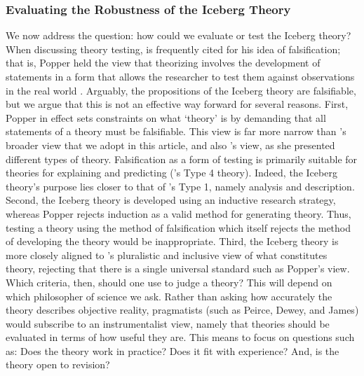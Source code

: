 \documentclass[smallextended]{svjour3}
\begin{document}
\subsubsection{Evaluating the Robustness of the Iceberg Theory}
We now address the question: how could we evaluate or test the Iceberg theory? When discussing theory testing, \citet{popper1980} is frequently cited for his idea of falsification; that is, Popper held the view that theorizing involves the development of statements in a form that allows the researcher to test them against observations in the real world \citep[p. 614]{gregor2006nature}. Arguably, the propositions of the Iceberg theory are falsifiable, but we argue that this is not an effective way forward for several reasons. First, Popper in effect sets constraints on what `theory' is by demanding that all statements of a theory must be falsifiable. This view is far more narrow than \citet{sandberg2021meanings}'s broader view that we adopt in this article, and also \citet{gregor2006nature}'s view, as she presented different types of theory. Falsification as a form of testing is primarily suitable for theories for explaining and predicting (\citet{gregor2006nature}'s Type 4 theory). Indeed, the Iceberg theory's purpose lies closer to that of \citet{gregor2006nature}'s Type 1, namely analysis and description.
Second, the Iceberg theory is developed using an inductive research strategy, whereas Popper rejects induction as a valid method for generating theory. Thus, testing a theory using the method of falsification which itself rejects the method of developing the theory would be inappropriate.
Third, the Iceberg theory is more closely aligned to \citet{sandberg2021meanings}'s pluralistic and inclusive view of what constitutes theory, rejecting that there is a single universal standard such as Popper's view. Which criteria, then, should one use to judge a theory? This will depend on which philosopher of science we ask. Rather than asking how accurately the theory describes objective reality, pragmatists (such as Peirce, Dewey, and James) would subscribe to an instrumentalist view, namely that theories should be evaluated in terms of how useful they are. This means to focus on questions such as: Does the theory work in practice? Does it fit with experience? And, is the theory open to revision? 


\end{document}
